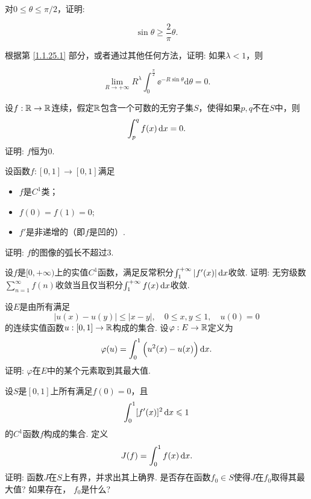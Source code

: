 \begin{example}
\begin{enuma}
  \item 对$0\le\theta\le\pi/2$，证明:
\end{enuma}
    \[ \sin\theta\ge\frac2\pi\theta. \]
\begin{eenum}\setcounter{enumi}{1}
  \item 根据第  \ref{1.1.25.1} 部分，或者通过其他任何方法，证明: 如果$\lambda<1$，则
\end{eenum}
\[ \lim_{R\to+\infty}R^\lambda\int_0^{\frac\pi2}\ee^{-R\sin\theta}\mathrm d\theta=0. \]
\end{example}

\begin{example}
  设$f:\mathbb R\to\mathbb R$连续，假定$\mathbb R$包含一个可数的无穷子集$S$，使得如果$p,q$不在$S$中，则
    \[ \int_p^qf(x)\,\mathrm dx=0. \]
  证明: $f$恒为0.
\end{example}

\begin{example}
  设函数$f:[0,1]\to[0,1]$满足
  \begin{itemize}
    \item $f$是$C^1$类；
    \item $f(0)=f(1)=0$;
    \item $f'$是非递增的（即$f$是凹的）.
  \end{itemize}
  证明: $f$的图像的弧长不超过3.
\end{example}

\begin{example}
  设$f$是$[0,+\infty)$上的实值$C^1$函数，满足反常积分$\int_1^{+\infty}|f'(x)|\,\mathrm dx$收敛. 证明: 无穷级数$\sum_{n=1}^{\infty} f(n)$收敛当且仅当积分$\int_1^{+\infty} f(x)\,\mathrm dx$收敛.
\end{example}

\begin{example}
  设$E$是由所有满足
   \[ |u(x)-u(y)|\le|x-y|,\quad 0\le x,y\le1,\quad u(0)=0 \]
  的连续实值函数$u:[0,1]\to\mathbb R$构成的集合. 设$\varphi:E\to\mathbb R$定义为
   \[ \varphi(u)=\int_0^1\Big(u^2(x)-u(x)\Big)\,\mathrm dx. \]
  证明: $\varphi$在$E$中的某个元素取到其最大值.
\end{example}

\begin{example}
  设$S$是$[0,1]$上所有满足$f(0)=0$，且
   \[ \int_0^1[f'(x)]^2\,\mathrm dx \leqslant 1 \]
  的$C^1$函数$f$构成的集合. 定义
   \[ J(f) = \int_0^1f(x)\,\mathrm dx. \]
   证明: 函数$J$在$S$上有界，并求出其上确界. 是否存在函数$f_0\in S$使得$J$在$f_0$取得其最大值? 如果存在， $f_0$是什么?
\end{example}

